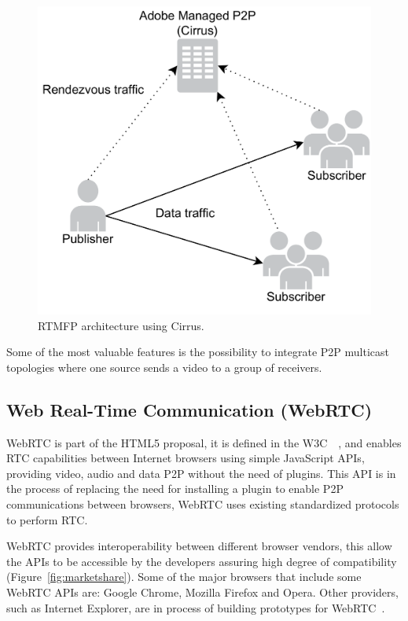  \begin{figure}[h]
  \centering
    \includegraphics[scale=0.4]{./figures/cirrusAdobe.pdf}
      \caption[RTMFP architecture using Cirrus]{RTMFP architecture using Cirrus.}
	\label{fig:RTMFParchitecture}
\end{figure}
 
Some of the most valuable features is the possibility to integrate P2P multicast topologies where one source sends a video to a group of receivers.

\subsection{Web Real-Time Communication (WebRTC)}

WebRTC is part of the HTML5 proposal, it is defined in the W3C~\cite{webrtcW3cgroup}~\cite{getusermediaDraft}, and enables RTC capabilities between Internet browsers using simple JavaScript APIs, providing video, audio and data P2P without the need of plugins. This API is in the process of replacing the need for installing a plugin to enable P2P communications between browsers, WebRTC uses existing standardized protocols to perform RTC. 


WebRTC provides interoperability between different browser vendors, this allow the APIs to be accessible by the developers assuring high degree of compatibility (Figure~\ref{fig:marketshare}). Some of the major browsers that include some WebRTC APIs are: Google Chrome, Mozilla Firefox and Opera. Other providers, such as Internet Explorer, are in process of building prototypes for WebRTC~\cite{IEwebRTC}. 

